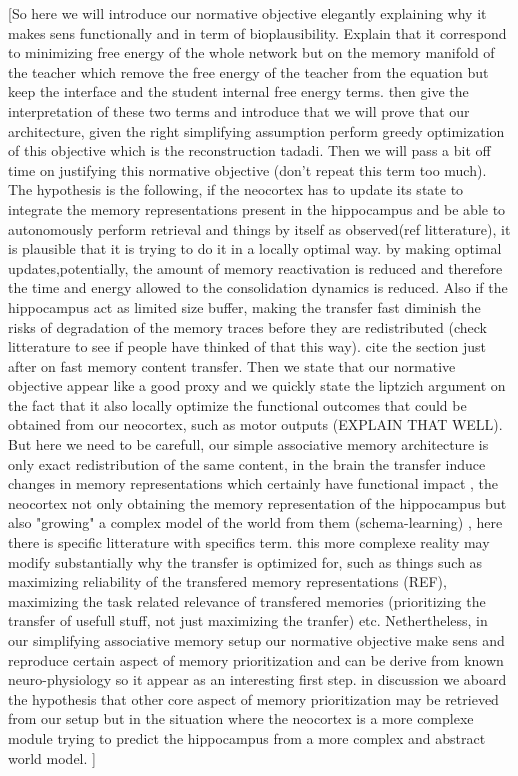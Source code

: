 \documentclass[10pt,letterpaper]{article}
\theoremstyle{plain}
\theoremstyle{remark}
\begin{document}
[So here we will introduce our normative objective elegantly explaining why it makes sens functionally and in term of bioplausibility. Explain that it correspond to minimizing free energy of the whole network but on the memory manifold of the teacher which remove the free energy of the teacher from the equation but keep the interface and the student internal free energy terms. then give the interpretation of these two terms and introduce that we will prove that our architecture, given the right simplifying assumption perform greedy optimization of this objective which is the reconstruction tadadi. 
Then we will pass a bit off time on justifying this normative objective (don't repeat this term too much).
The hypothesis is the following, if the neocortex has to update its state to integrate the memory representations present in the hippocampus and be able to autonomously perform retrieval and things by itself as observed(ref litterature), it is plausible that it is trying to do it in a locally optimal way.
by making optimal updates,potentially, the amount of memory reactivation is reduced and therefore the time and energy allowed to the consolidation dynamics is reduced. Also if the hippocampus act as limited size buffer, making the transfer fast diminish the risks of degradation of the memory traces before they are redistributed (check litterature to see if people have thinked of that this way). cite the section just after on fast memory content transfer.
Then we state that our normative objective appear like a good proxy and we quickly state the liptzich argument on the fact that it also locally optimize the functional outcomes that could be obtained from our neocortex, such as motor outputs (EXPLAIN THAT WELL). But here we need to be carefull, our simple associative memory architecture is only exact redistribution of the same content, in the brain the transfer induce changes in memory representations which certainly have functional impact , the neocortex not only obtaining the memory representation of the hippocampus but also "growing" a complex model of the world from them (schema-learning) , here there is specific litterature with specifics term. this more complexe reality may modify substantially why the transfer is optimized for, such as things such as maximizing reliability of the transfered memory representations (REF), maximizing the task related relevance of transfered memories (prioritizing the transfer of usefull stuff, not just maximizing the tranfer) etc. Nethertheless, in our simplifying associative memory setup our normative objective make sens and reproduce certain aspect of memory prioritization and can be derive from known neuro-physiology so it appear as an interesting first step. in discussion we aboard the hypothesis that other core aspect of memory prioritization may be retrieved from our setup but in the situation where the neocortex is a more complexe module trying to predict the hippocampus from a more complex and abstract world model. ]
\end{document}
